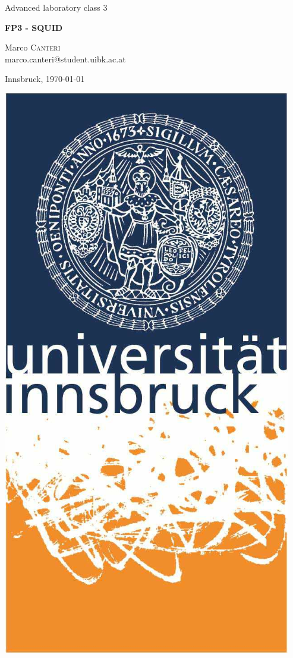 \documentclass[a4paper,10pt]{article}
\begin{document}
\begin{titlepage}
 \begin{center}
	\Large{Advanced laboratory class 3}
	\end{center}
	\begin{center}
	 \LARGE{\textbf{FP3 - SQUID}}
	\end{center}
	
	\begin{center}
	
	\large Marco \textsc{Canteri} \\
	marco.canteri@student.uibk.ac.at
	\end{center}
	
	\begin{center}
	\vspace{1cm}
	Innsbruck, \today
	\vspace{2cm}
	\end{center}
	
	\begin{center}
	\includegraphics[scale=0.4]{img/uibk} 
	\end{center}


\end{titlepage}
\end{document}
